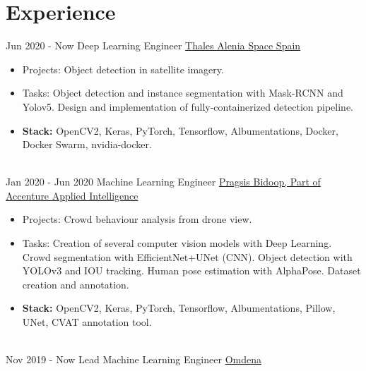 \documentclass[letterpaper]{twentysecondcv} %
\begin{document}
\makeprofile %




\section{Experience}
\begin{twenty} %
\twentyitem
    	{Jun 2020 - }
		{Now}
        {Deep Learning Engineer}
        {\href{https://www.thalesgroup.com/es/espana/espacio}{Thales Alenia Space Spain}}
        {}
        {\begin{itemize}
			\item Projects: Object detection in satellite imagery.
			\item Tasks: Object detection and instance segmentation with Mask-RCNN and Yolov5. Design and implementation of fully-containerized detection pipeline.
			\item \textbf{Stack:} OpenCV2, Keras, PyTorch, Tensorflow, Albumentations, Docker, Docker Swarm, nvidia-docker.
        \end{itemize}}
        \\
\twentyitem
    	{Jan 2020 - }
		{Jun 2020}
        {Machine Learning Engineer}
        {\href{https://pragsis.com/}{Pragsis Bidoop, Part of Accenture Applied Intelligence}}
        {}
        {\begin{itemize}
			\item Projects: Crowd behaviour analysis from drone view.
			\item Tasks: Creation of several computer vision models with Deep Learning. Crowd segmentation with EfficientNet+UNet (CNN). Object detection with YOLOv3 and IOU tracking. Human pose estimation with AlphaPose. Dataset creation and annotation.
			\item \textbf{Stack:} OpenCV2, Keras, PyTorch, Tensorflow, Albumentations, Pillow, UNet, CVAT annotation tool.
        \end{itemize}}
        \\
\twentyitem
    	{Nov 2019 - }
		{Now}
        {Lead Machine Learning Engineer}
        {\href{https://omdena.com}{Omdena}}
        {}
        {\begin{itemize}

\end{itemize}}
\end{twenty}
\end{document}
